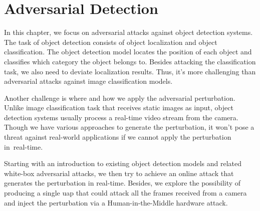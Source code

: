 \chapter{Adversarial Detection}
\label{chpt:detection}


In this chapter, we focus on adversarial attacks against object detection systems. The task of object detection consists of object localization and object classification. The object detection model locates the position of each object and classifies which category the object belongs to. Besides attacking the classification task, we also need to deviate localization results. Thus, it's more challenging than adversarial attacks against image classification models.

Another challenge is where and how we apply the adversarial perturbation. Unlike image classification task that receives static images as input, object detection systems usually process a real-time video stream from the camera. Though we have various approaches to generate the perturbation, it won't pose a threat against real-world applications if we cannot apply the perturbation in real-time.

Starting with an introduction to existing object detection models and related white-box adversarial attacks, we then try to achieve an online attack that generates the perturbation in real-time. Besides, we explore the possibility of producing a single \acrfull{uap} that could attack all the frames received from a camera and inject the perturbation via a Human-in-the-Middle hardware attack.




